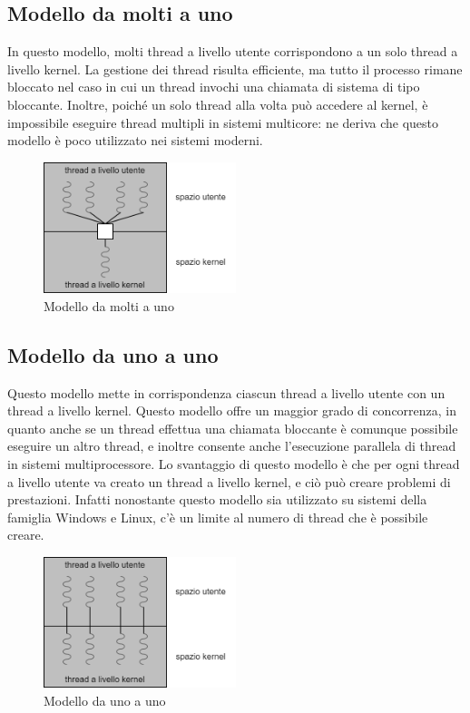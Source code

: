         \subsection{Modello da molti a uno}
            In questo modello, molti thread a livello utente corrispondono a un solo thread a livello kernel. La gestione dei thread risulta efficiente, ma tutto il processo rimane bloccato nel caso in cui un thread invochi una chiamata di sistema di tipo bloccante. Inoltre, poiché un solo thread alla volta può accedere al kernel, è impossibile eseguire thread multipli in sistemi multicore: ne deriva che questo modello è poco utilizzato nei sistemi moderni.
            
            \begin{figure}[h]
                \centering
                \includegraphics[width=0.5\textwidth]{img/thread2.png}
                \caption{Modello da molti a uno}
                \label{fig:my_label}
            \end{figure}
            
            
        \subsection{Modello da uno a uno}
            Questo modello mette in corrispondenza ciascun thread a livello utente con un thread a livello kernel. Questo modello offre un maggior grado di concorrenza, in quanto anche se un thread effettua una chiamata bloccante è comunque possibile eseguire un altro thread, e inoltre consente anche l'esecuzione parallela di thread in sistemi multiprocessore. Lo svantaggio di questo modello è che per ogni thread a livello utente va creato un thread a livello kernel, e ciò può creare problemi di prestazioni. Infatti nonostante questo modello sia utilizzato su sistemi della famiglia Windows e Linux, c'è un limite al numero di thread che è possibile creare.
            
            \begin{figure}[h]
                \centering
                \includegraphics[width=0.5\textwidth]{img/thread3.png}
                \caption{Modello da uno a uno}
                \label{fig:my_label}
            \end{figure}
            
